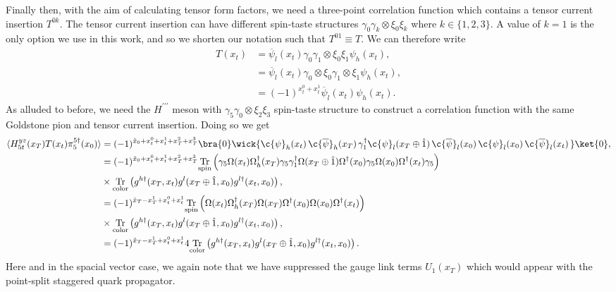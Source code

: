 Finally then, with the aim of calculating tensor form factors, we need a three-point correlation function which contains a tensor current insertion $T^{0k}$.  The tensor current insertion can have different spin-taste structures $\gamma_0\gamma_k\otimes\xi_0\xi_k$ where $k\in \{1,2,3\}$.  A value of $k=1$ is the only option we use in this work, and so we shorten our notation such that $T^{01}\equiv T$.  We can therefore write 
\begin{equation}\label{eq:tensor_current_insertion}
\begin{split}
    T(x_t) &= \overline{\psi}_l(x_t)\gamma_0\gamma_1\otimes\xi_0\xi_1\psi_h(x_t),\\
    &= \overline{\psi}_l(x_t)\gamma_0\otimes\xi_0\gamma_1\otimes\xi_1\psi_h(x_t),\\
    &= (-1)^{x^0_t+x^1_t}\overline{\psi}_l(x_t)\psi_h(x_t).
\end{split}
\end{equation}
As alluded to before, we need the $H^{\prime\prime\prime}$ meson with $\gamma_5\gamma_0 \otimes \xi_2\xi_3$ spin-taste structure to construct a correlation function with the same Goldstone pion and tensor current insertion.  Doing so we get
\begin{equation}\label{eq:tensor3ptcorr}
\begin{split}
\langle H^{yz}_{5t}(x_T)T(x_t)\pi^{5\dagger}_5(x_0) \rangle &= (-1)^{\tilde{x}_0+x^0_t+x^1_t+x^2_T+x^3_T}\bra{0}\wick{
\c{\psi}_h(x_t)\, \c{\overline{\psi}}_h(x_T)\, \gamma_1^\dagger\c{\psi}_l(x_T\oplus\hat1)\, \c{\overline{\psi}}_l(x_0)\,
\c{\psi}_l(x_0)\, \c{\overline{\psi}}_l(x_t)\,}\ket{0},\\
&=(-1)^{\tilde{x}_0+x^0_t+x^1_t+x^2_T+x^3_T} \underset{\mathrm{spin}}{\mathrm{Tr}}\left( 
\gamma_5\Omega(x_t)\Omega^\dagger_h(x_T)\gamma_5\gamma^\dagger_1\Omega(x_T\oplus\hat1)\Omega^\dagger(x_0)\gamma_5\Omega(x_0)\Omega^\dagger(x_t)\gamma_5\right)\\
&\times \underset{\mathrm{color}}{\mathrm{Tr}}\left( g^{h\dagger}(x_T,x_t)g^l(x_T\oplus\hat1,x_0)g^{l\dagger}(x_t,x_0)\right),\\
&= (-1)^{\tilde{x}_T-x^1_T+x^0_t+x^1_t}\underset{\mathrm{spin}}{\mathrm{Tr}}\left( 
\Omega(x_t)\Omega^\dagger_h(x_T)\Omega(x_T)\Omega^\dagger(x_0)\Omega(x_0)\Omega^\dagger(x_t)\right)\\
&\times \underset{\mathrm{color}}{\mathrm{Tr}}\left( g^{h\dagger}(x_T,x_t)g^l(x_T\oplus\hat1,x_0)g^{l\dagger}(x_t,x_0)\right),\\
&= (-1)^{\tilde{x}_T-x^1_T+x^0_t+x^1_t} 4\underset{\mathrm{color}}{\mathrm{Tr}}\left( g^{h\dagger}(x_T,x_t)g^l(x_T\oplus\hat1,x_0)g^{l\dagger}(x_t,x_0)\right).
\end{split}
\end{equation}
Here and in the spacial vector case, we again note that we have suppressed the gauge link terms $U_1(x_T)$ which would appear with the point-split staggered quark propagator. 

